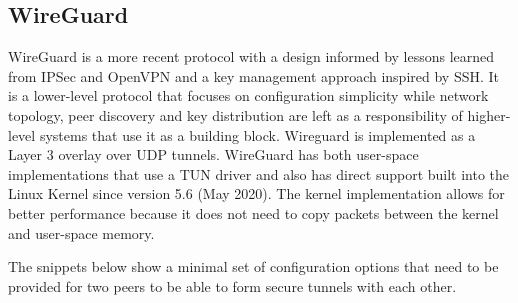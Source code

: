 \hypertarget{wireguard}{%
\subsection{WireGuard}\label{wireguard}}

WireGuard \autocite{donenfeldWireGuardNextGeneration2017} is a more
recent protocol with a design informed by lessons learned from IPSec and
OpenVPN and a key management approach inspired by SSH. It is a
lower-level protocol that focuses on configuration simplicity while
network topology, peer discovery and key distribution are left as a
responsibility of higher-level systems that use it as a building block.
Wireguard is implemented as a Layer 3 overlay over UDP tunnels.
WireGuard has both user-space implementations that use a TUN driver and
also has direct support built into the Linux Kernel since version 5.6
(May 2020). The kernel implementation allows for better performance
because it does not need to copy packets between the kernel and
user-space memory.

The snippets below show a minimal set of configuration options that need
to be provided for two peers to be able to form secure tunnels with each
other.

\begin{Shaded}
\begin{Highlighting}[]
\KeywordTok{[Interface]}
\OtherTok{=}
\OtherTok{=}\StringTok{ }
\OtherTok{=}

\KeywordTok{[Peer]}
\OtherTok{=}
\OtherTok{=}
\OtherTok{=}
\end{Highlighting}
\end{Shaded}

\begin{Shaded}
\begin{Highlighting}[]
\KeywordTok{[Interface]}
\OtherTok{=}
\OtherTok{=}\StringTok{ }
\OtherTok{=}

\KeywordTok{[Peer]}
\OtherTok{=}
\OtherTok{=}
\end{Highlighting}
\end{Shaded}

